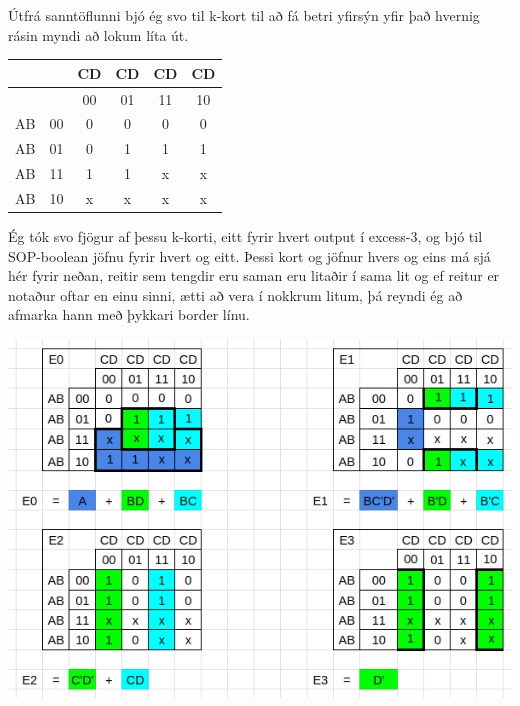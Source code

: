 \documentclass{article}
\begin{document}
Útfrá sanntöflunni bjó ég svo til k-kort til að fá betri yfirsýn yfir það hvernig rásin myndi að lokum líta út.

\begin{center}
    \begin{tabular}{|c|c|c|c|c|c|}
        \hline
        &&CD&CD&CD&CD\\
        \hline
        &&00&01&11&10\\
        \hline
        AB&00&0&0&0&0\\
        \hline
        AB&01&0&1&1&1\\
        \hline
        AB&11&1&1&x&x\\
        \hline
        AB&10&x&x&x&x\\
        \hline
    \end{tabular}
\end{center}

Ég tók svo fjögur af þessu k-korti, eitt fyrir hvert output í excess-3, og bjó til SOP-boolean jöfnu fyrir hvert og eitt. 
Þessi kort og jöfnur hvers og eins má sjá hér fyrir neðan, reitir sem tengdir eru saman eru litaðir í sama lit og ef reitur er notaður oftar en einu sinni, 
ætti að vera í nokkrum litum, þá reyndi ég að afmarka hann með þykkari border línu.

\begin{center}
    \includegraphics[scale=0.5]{kkort.png}
\end{center}
\end{document}
